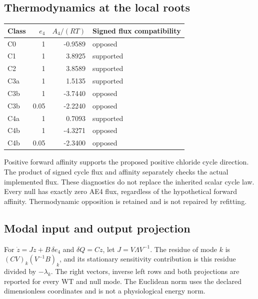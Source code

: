 \subsection{Thermodynamics at the local roots}

\begin{center}\begin{tabular}{lrrl}\hline Class & $e_4$ & $A_4/(RT)$ & Signed flux compatibility\\\hline

C0 & 1 & -0.9589 & opposed\\

C1 & 1 & 3.8925 & supported\\

C2 & 1 & 3.8589 & supported\\

C3a & 1 & 1.5135 & supported\\

C3b & 1 & -3.7440 & opposed\\

C3b & 0.05 & -2.2240 & opposed\\

C4a & 1 & 0.7093 & supported\\

C4b & 1 & -4.3271 & opposed\\

C4b & 0.05 & -2.3400 & opposed\\

\hline\end{tabular}\end{center}

Positive forward affinity supports the proposed positive chloride cycle direction. The product of signed cycle flux and affinity separately checks the actual implemented flux. These diagnostics do not replace the inherited scalar cycle law. Every null has exactly zero AE4 flux, regardless of the hypothetical forward affinity. Thermodynamic opposition is retained and is not repaired by refitting.

\subsection{Modal input and output projection}

For $\dot z=Jz+B\,\delta e_4$ and $\delta Q=Cz$, let $J=V\Lambda V^{-1}$. The residue of mode $k$ is $(CV)_k(V^{-1}B)_k$, and its stationary sensitivity contribution is this residue divided by $-\lambda_k$. The right vectors, inverse left rows and both projections are reported for every WT and null mode. The Euclidean norm uses the declared dimensionless coordinates and is not a physiological energy norm.

